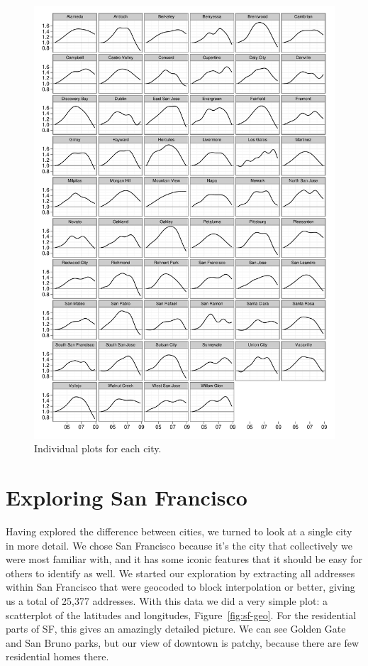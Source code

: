 \documentclass[oneside]{article}
\begin{document}
\begin{figure}[htbp]
  \centering
  \includegraphics[width=0.9\linewidth]{cities-individual}
  \caption{Individual plots for each city.}
  \label{fig:individual}
\end{figure}

\section{Exploring San Francisco}

Having explored the difference between cities, we turned to look at a single city in more detail.  We chose San Francisco because it's the city that collectively we were most familiar with, and it has some iconic features that it should be easy for others to identify as well.  We started our exploration by extracting all addresses within San Francisco that were geocoded to block interpolation or better, giving us a total of 25,377 addresses.  With this data we did a very simple plot: a scatterplot of the latitudes and longitudes, Figure~\ref{fig:sf-geo}.  For the residential parts of SF, this gives an amazingly detailed picture.  We can see Golden Gate and San Bruno parks, but our view of downtown is patchy, because there are few residential homes there.
\end{document}
